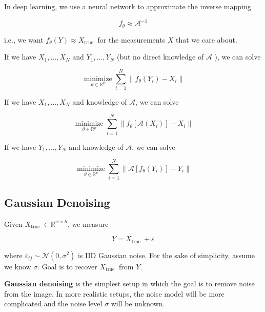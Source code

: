 \documentclass{report}
\begin{document}
\begin{concept}
    In deep learning, we use a neural network to approximate the inverse mapping

    $$
    f_{\theta} \approx \mathcal{A}^{-1}
    $$

    i.e., we want $f_{\theta}(Y) \approx X_{\text {true }}$ for the measurements $X$ that we care about.

    If we have $X_{1}, \ldots, X_{N}$ and $Y_{1}, \ldots, Y_{N}$ (but no direct knowledge of $\mathcal{A}$ ), we can solve

    $$
    \underset{\theta \in \mathbb{R}^{p}}{\operatorname{minimize}} \sum_{i=1}^{N}\left\|f_{\theta}\left(Y_{i}\right)-X_{i}\right\|
    $$

    If we have $X_{1}, \ldots, X_{N}$ and knowledge of $\mathcal{A}$, we can solve

    $$
    \underset{\theta \in \mathbb{R}^{p}}{\operatorname{minimize}} \sum_{i=1}^{N}\left\|f_{\theta}\left[\mathcal{A}\left(X_{i}\right)\right]-X_{i}\right\|
    $$

    If we have $Y_{1}, \ldots, Y_{N}$ and knowledge of $\mathcal{A}$, we can solve

    $$
    \underset{\theta \in \mathbb{R}^{p}}{\operatorname{minimize}} \sum_{i=1}^{N}\left\|\mathcal{A}\left[f_{\theta}\left(Y_{i}\right)\right]-Y_{i}\right\|
    $$
\end{concept}

\subsection{Gaussian Denoising}

\begin{definition}
    Given $X_{\text {true }} \in \mathbb{R}^{w \times h}$, we measure

    $$
    Y=X_{\text {true }}+\varepsilon
    $$

    where $\varepsilon_{i j} \sim \mathcal{N}\left(0, \sigma^{2}\right)$ is IID Gaussian noise. For the sake of simplicity, assume we know $\sigma$. Goal is to recover $X_{\text {true }}$ from $Y$.

    \textbf{Gaussian denoising} is the simplest setup in which the goal is to remove noise from the image. In more realistic setups, the noise model will be more complicated and the noise level $\sigma$ will be unknown.
\end{definition}
\end{document}
